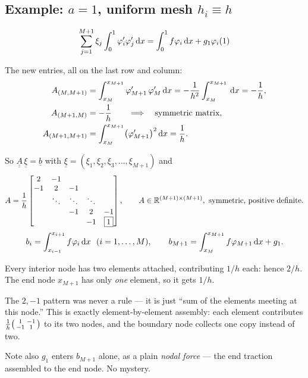 \subsection*{Example: $a=1$, uniform mesh $h_{i}\equiv h$}

\begin{equation}
  \sum_{j=1}^{M+1}\xi_{j}\int_{0}^{1}\varphi_{i}'\varphi_{j}'\,\mathrm{d} x
  = \int_{0}^{1} f\varphi_{i}\,\mathrm{d} x + g_{1}\varphi_{i}(1)
\end{equation}

The new entries, all on the last row and column:
\begin{align}
  A_{(M,M+1)} &= \int_{x_{M}}^{x_{M+1}}\varphi_{M+1}'\,\varphi_{M}'\,\mathrm{d} x
    = -\frac{1}{h^{2}}\int_{x_{M}}^{x_{M+1}}\,\mathrm{d} x = -\frac{1}{h},\\
  A_{(M+1,M)} &= -\frac{1}{h}
    \qquad\Longrightarrow\quad \text{symmetric matrix},\\
  A_{(M+1,M+1)} &= \int_{x_{M}}^{x_{M+1}}\bigl(\varphi_{M+1}'\bigr)^{2}\,\mathrm{d} x
    = \frac{1}{h}.
\end{align}

So $\underline{\underline{A}}\,\underline{\xi}=\underline{b}$ with
$\underline{\xi}=(\xi_{1},\xi_{2},\xi_{3},\dots,\xi_{M+1})$ and
\begin{equation}\label{eq:Aneu}
  A=\frac{1}{h}
  \begin{bmatrix}
    2 & -1 &        &    &    \\
   -1 &  2 & -1     &    &    \\
      & \ddots & \ddots & \ddots & \\
      &    & -1 & 2 & -1\\
      &    &    & -1 & \boxed{1}
  \end{bmatrix},
  \qquad
  A\in\mathbb{R}^{(M+1)\times(M+1)},\ \text{symmetric, positive definite.}
\end{equation}
\begin{equation}
  b_{i}=\int_{x_{i-1}}^{x_{i+1}} f\phih_{i}\dx \ \ (i=1,\dots,M),
  \qquad
  b_{M+1}=\int_{x_{M}}^{x_{M+1}} f\phih_{M+1}\dx + g_{1}.
\end{equation}

\begin{intuition}
Every interior node has two elements attached, contributing $1/h$ each: hence
$2/h$. The end node $x_{M+1}$ has only \emph{one} element, so it gets $1/h$.

The $2,-1$ pattern was never a rule --- it is just ``sum of the elements meeting
at this node.'' This is exactly element-by-element assembly: each element
contributes $\frac{1}{h}\begin{psmallmatrix}1&-1\\-1&1\end{psmallmatrix}$ to its
two nodes, and the boundary node collects one copy instead of two.

Note also $g_{1}$ enters $b_{M+1}$ alone, as a plain \emph{nodal force} --- the
end traction assembled to the end node. No mystery.
\end{intuition}

